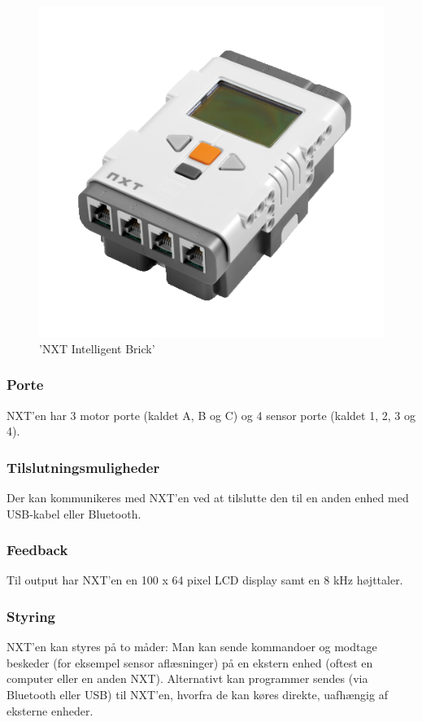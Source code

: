 \begin{figure}
\begin{center}
\includegraphics[scale=.5]{./graphics/nxt/brick}
\end{center}
\caption{'NXT Intelligent Brick'}
\label{platform:nxt}
\end{figure}

\subsubsection{Porte}
NXT'en har 3 motor porte (kaldet A, B og C) og 4 sensor porte (kaldet 1, 2, 3 og 4).

\subsubsection{Tilslutningsmuligheder}
Der kan kommunikeres med NXT'en ved at tilslutte den til en anden enhed med USB-kabel eller Bluetooth\textregistered.

\subsubsection{Feedback}
Til output har NXT'en en 100 x 64 pixel LCD display samt en 8 kHz højttaler.

\subsubsection{Styring}
NXT'en kan styres på to måder:
Man kan sende kommandoer og modtage beskeder (for eksempel sensor aflæsninger) på en ekstern enhed (oftest en computer eller en anden NXT).
Alternativt kan programmer sendes (via Bluetooth eller USB) til NXT'en, hvorfra de kan køres direkte, uafhængig af eksterne enheder.


